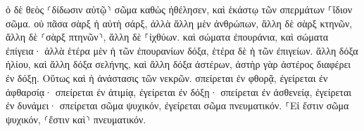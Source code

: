\documentclass{openreader}
\begin{document}
ὁ δὲ θεὸς ⸂δίδωσιν αὐτῷ⸃ σῶμα καθὼς ἠθέλησεν, καὶ ἑκάστῳ τῶν σπερμάτων ⸀ἴδιον σῶμα. 
οὐ πᾶσα σὰρξ ἡ αὐτὴ σάρξ, ἀλλὰ ἄλλη μὲν ἀνθρώπων, ἄλλη δὲ σὰρξ κτηνῶν, ἄλλη δὲ ⸂σὰρξ πτηνῶν⸃, ἄλλη δὲ ⸀ἰχθύων. 
καὶ σώματα ἐπουράνια, καὶ σώματα ἐπίγεια· ἀλλὰ ἑτέρα μὲν ἡ τῶν ἐπουρανίων δόξα, ἑτέρα δὲ ἡ τῶν ἐπιγείων. 
ἄλλη δόξα ἡλίου, καὶ ἄλλη δόξα σελήνης, καὶ ἄλλη δόξα ἀστέρων, ἀστὴρ γὰρ ἀστέρος διαφέρει ἐν δόξῃ. 
Οὕτως καὶ ἡ ἀνάστασις τῶν νεκρῶν. σπείρεται ἐν φθορᾷ, ἐγείρεται ἐν ἀφθαρσίᾳ· 
σπείρεται ἐν ἀτιμίᾳ, ἐγείρεται ἐν δόξῃ· σπείρεται ἐν ἀσθενείᾳ, ἐγείρεται ἐν δυνάμει· 
σπείρεται σῶμα ψυχικόν, ἐγείρεται σῶμα πνευματικόν. ⸀Εἰ ἔστιν σῶμα ψυχικόν, ⸂ἔστιν καὶ⸃ πνευματικόν. 
\end{document}
